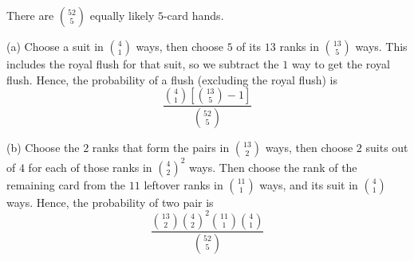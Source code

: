 There are $\binom{52}{5}$ equally likely $5$-card hands.

(a) Choose a suit in $\binom{4}{1}$ ways, then choose $5$ of its $13$ ranks in
$\binom{13}{5}$ ways. This includes the royal flush for that suit, so we
subtract the $1$ way to get the royal flush. Hence, the probability of a
flush (excluding the royal flush) is
$$\frac{\binom{4}{1}\left[\binom{13}{5} - 1\right]}{\binom{52}{5}}$$

(b) Choose the $2$ ranks that form the pairs in $\binom{13}{2}$ ways, then
choose $2$ suits out of $4$ for each of those ranks in $\binom{4}{2}^{2}$ ways.
Then choose the rank of the remaining card from the $11$ leftover ranks in
$\binom{11}{1}$ ways, and its suit in $\binom{4}{1}$ ways. Hence, the
probability of two pair is
$$\frac{\binom{13}{2}\binom{4}{2}^{2}\binom{11}{1}\binom{4}{1}}{\binom{52}{5}}$$
